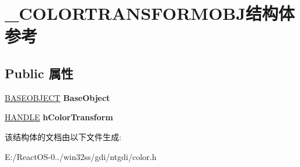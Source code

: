 \hypertarget{struct___c_o_l_o_r_t_r_a_n_s_f_o_r_m_o_b_j}{}\section{\+\_\+\+C\+O\+L\+O\+R\+T\+R\+A\+N\+S\+F\+O\+R\+M\+O\+B\+J结构体 参考}
\label{struct___c_o_l_o_r_t_r_a_n_s_f_o_r_m_o_b_j}
\subsection*{Public 属性}
\begin{DoxyCompactItemize}
\item 
\mbox{\label{struct___c_o_l_o_r_t_r_a_n_s_f_o_r_m_o_b_j_aa8c5b3a52c2ab66ac03def47bcb680a2}} 
\hyperlink{class_b_a_s_e_o_b_j_e_c_t}{B\+A\+S\+E\+O\+B\+J\+E\+CT} {\bfseries Base\+Object}
\item 
\mbox{\label{struct___c_o_l_o_r_t_r_a_n_s_f_o_r_m_o_b_j_a80039e154b1464a3512f4799c8785b59}} 
\hyperlink{interfacevoid}{H\+A\+N\+D\+LE} {\bfseries h\+Color\+Transform}
\end{DoxyCompactItemize}


该结构体的文档由以下文件生成\+:\begin{DoxyCompactItemize}
\item 
E\+:/\+React\+O\+S-\/0../win32ss/gdi/ntgdi/color.\+h\end{DoxyCompactItemize}
